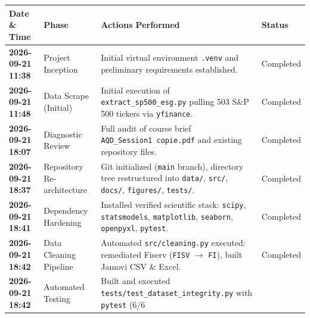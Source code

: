 \documentclass[
]{article}
\newcounter{none} %
\begin{document}
{\def\LTcaptype{none} %
\begin{longtable}[]{@{}
  >{\raggedright\arraybackslash}p{}
  >{\raggedright\arraybackslash}p{}
  >{\raggedright\arraybackslash}p{}
  >{\raggedright\arraybackslash}p{}@{}}
\toprule\noalign{}
\begin{minipage}[b]{\linewidth}\raggedright
Date \& Time
\end{minipage} & \begin{minipage}[b]{\linewidth}\raggedright
Phase
\end{minipage} & \begin{minipage}[b]{\linewidth}\raggedright
Actions Performed
\end{minipage} & \begin{minipage}[b]{\linewidth}\raggedright
Status
\end{minipage} \\
\midrule\noalign{}
\endhead
\bottomrule\noalign{}
\endlastfoot
\textbf{2026-09-21 11:38} & Project Inception & Initial virtual
environment \texttt{.venv} and preliminary requirements established. &
Completed \\
\textbf{2026-09-21 11:48} & Data Scrape (Initial) & Initial execution of
\texttt{extract\_sp500\_esg.py} pulling 503 S\&P 500 tickers via
\texttt{yfinance}. & Completed \\
\textbf{2026-09-21 18:07} & Diagnostic Review & Full audit of course
brief \texttt{AQD\_Session1\ copie.pdf} and existing repository files. &
Completed \\
\textbf{2026-09-21 18:37} & Repository Re-architecture & Git initialized
(\texttt{main} branch), directory tree restructured into \texttt{data/},
\texttt{src/}, \texttt{docs/}, \texttt{figures/}, \texttt{tests/}. &
Completed \\
\textbf{2026-09-21 18:41} & Dependency Hardening & Installed verified
scientific stack: \texttt{scipy}, \texttt{statsmodels},
\texttt{matplotlib}, \texttt{seaborn}, \texttt{openpyxl},
\texttt{pytest}. & Completed \\
\textbf{2026-09-21 18:42} & Data Cleaning Pipeline & Automated
\texttt{src/cleaning.py} executed: remediated Fiserv (\texttt{FISV}
\(\rightarrow\) \texttt{FI}), built Jamovi CSV \& Excel. & Completed \\
\textbf{2026-09-21 18:42} & Automated Testing & Built and executed
\texttt{tests/test\_dataset\_integrity.py} with \texttt{pytest} (6/6

\end{longtable}}
\end{document}
